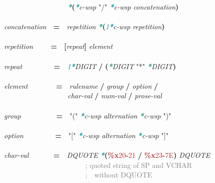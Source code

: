 \documentclass{article}
\begin{document}
{\mbox{~~~~~~~~~~~~~~~~~~}\textcolor{teal}{\emph{\textbf{*}}}\textbf{(}\textcolor{teal}{\emph{\textbf{*}}}\emph{c-{}wsp} \textcolor{BrickRed}{"/"} \textcolor{teal}{\emph{\textbf{*}}}\emph{c-{}wsp} \emph{concatenation}\textbf{)}\\
\\
\emph{concatenation}\mbox{~~}\textbf{=}\mbox{~~}\emph{repetition} \textcolor{teal}{\emph{\textbf{*}}}\textbf{(}\textcolor{teal}{\emph{1\textbf{*}}}\emph{c-{}wsp} \emph{repetition}\textbf{)}\\
\\
\emph{repetition}\mbox{~~~~~}\textbf{=}\mbox{~~}\textbf{[}\emph{repeat}\textbf{]} \emph{element}\\
\\
\emph{repeat}\mbox{~~~~~~~~~}\textbf{=}\mbox{~~}\textcolor{teal}{\emph{1\textbf{*}}}\emph{DIGIT} \textbf{/} \textbf{(}\textcolor{teal}{\emph{\textbf{*}}}\emph{DIGIT} \textcolor{BrickRed}{"*"} \textcolor{teal}{\emph{\textbf{*}}}\emph{DIGIT}\textbf{)}\\
\\
\emph{element}\mbox{~~~~~~~~}\textbf{=}\mbox{~~}\emph{rulename} \textbf{/} \emph{group} \textbf{/} \emph{option} \textbf{/}\\
\mbox{~~~~~~~~~~~~~~~~~~}\emph{char-{}val} \textbf{/} \emph{num-{}val} \textbf{/} \emph{prose-{}val}\\
\\
\emph{group}\mbox{~~~~~~~~~~}\textbf{=}\mbox{~~}\textcolor{BrickRed}{"("} \textcolor{teal}{\emph{\textbf{*}}}\emph{c-{}wsp} \emph{alternation} \textcolor{teal}{\emph{\textbf{*}}}\emph{c-{}wsp} \textcolor{BrickRed}{")"}\\
\\
\emph{option}\mbox{~~~~~~~~~}\textbf{=}\mbox{~~}\textcolor{BrickRed}{"["} \textcolor{teal}{\emph{\textbf{*}}}\emph{c-{}wsp} \emph{alternation} \textcolor{teal}{\emph{\textbf{*}}}\emph{c-{}wsp} \textcolor{BrickRed}{"]"}\\
\\
\emph{char-{}val}\mbox{~~~~~~~}\textbf{=}\mbox{~~}\emph{DQUOTE} \textcolor{teal}{\emph{\textbf{*}}}\textbf{(}\textcolor{Brown}{\textbf{\%{}x}20\textbf{-}21} \textbf{/} \textcolor{Brown}{\textbf{\%{}x}23\textbf{-}7E}\textbf{)} \emph{DQUOTE}\\
\mbox{~~~~~~~~~~~~~~~~~~~~~~~}\textcolor{gray}{; quoted string of SP and VCHAR}\\
\mbox{~~~~~~~~~~~~~~~~~~~~~~~}\textcolor{gray}{;\mbox{~~}without DQUOTE}\\
\\
}
\end{document}
